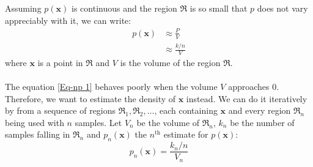 	\\ \\
	Assuming $p(\mathbf{x})$ is continuous and the region $\mathfrak{R}$ is so small that $p$ does not vary appreciably with it, we can write:
	\begin{equation}
		 \begin{split}
p(\mathbf{x}) &\approx \frac{P}{V} \\
&\approx \frac{k / n}{V}
\end{split}	
	\label{Eq-np 1}
	\end{equation}
	where $\mathbf{x}$ is a point in $\mathfrak{R}$ and $V$ is the volume of the region $\mathfrak{R}$.
	\\ \\
	The equation \ref{Eq-np 1} behaves poorly when the volume $V$ approaches 0. Therefore, we want to estimate the density of $\mathbf{x}$ instead. We can do it iteratively by from a sequence of regions $\mathfrak{R}_1, \mathfrak{R}_2, \dots$, each containing $\mathbf{x}$ and every region $\mathfrak{R}_n$ being used with $n$ samples. Let $V_n$ be the volume of $\mathfrak{R}_n$, $k_n$ be the number of samples falling in $\mathfrak{R}_n$ and $p_n(\mathbf{x})$ the $n^\text{th}$ estimate for $p(\mathbf{x})$:
	\begin{equation}
		p_n(\mathbf{x}) = \frac{k_n/n}{V_n}
		\label{Eq-np 2}
	\end{equation}
	
